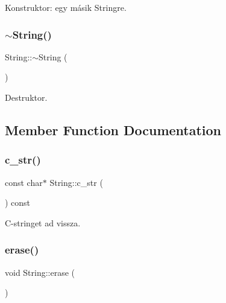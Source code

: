 Konstruktor\+: egy másik Stringre. 

\mbox{\label{class_string_ac40b2a3fb58c2d8556f5e6ff73510036}} 
\subsubsection{\texorpdfstring{$\sim$String()}{~String()}}
{\footnotesize\ttfamily String\+::$\sim$\+String (\begin{DoxyParamCaption}{ }\end{DoxyParamCaption})\hspace{0.3cm}{\ttfamily [inline]}}



Destruktor. 



\subsection{Member Function Documentation}
\mbox{\label{class_string_a0274f3e61533d15086816fb7f47ccb54}} 
\subsubsection{\texorpdfstring{c\_str()}{c\_str()}}
{\footnotesize\ttfamily const char$\ast$ String\+::c\+\_\+str (\begin{DoxyParamCaption}{ }\end{DoxyParamCaption}) const\hspace{0.3cm}{\ttfamily [inline]}}



C-\/stringet ad vissza. 

\mbox{\label{class_string_a3ce2ea55be9ec912bb2dbc88d461b479}} 
\subsubsection{\texorpdfstring{erase()}{erase()}}
{\footnotesize\ttfamily void String\+::erase (\begin{DoxyParamCaption}{ }\end{DoxyParamCaption})\hspace{0.3cm}{\ttfamily [inline]}}



